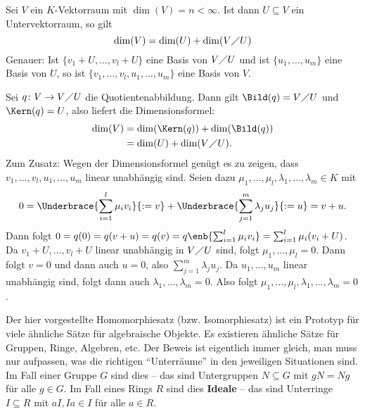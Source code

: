\begin{satz}
	\label{satz:11.9}
	Sei $V$ ein $K$-Vektorraum mit $\dim(V) = n < \infty$.
	Ist dann $U \subseteq V$ ein Untervektorraum, so gilt
	\[
		\dim(V) = \dim(U) + \dim(V \diagup U)
	\]
	Genauer: Ist $\{v_1+U,\dots,v_l + U\}$ eine Basis von $V \diagup U$ und ist $\{u_1,\dots,u_m\}$ eine Basis von $U$, so ist $\{v_1,\dots,v_l,u_1,\dots,u_m\}$ eine Basis von $V$.
\end{satz}

\begin{beweis}
	Sei $q \colon V \rightarrow V \diagup U$ die Quotientenabbildung.
	Dann gilt $\Bild(q) = V \diagup U$ und $\Kern(q) = U$, also liefert die Dimensionsformel:
	\begin{align*}
		\dim(V) &= \dim(\Kern(q)) + \dim(\Bild(q)) \\
		&= \dim(U) + \dim(V\diagup U).
	\end{align*}
	\newpage
	Zum Zusatz: Wegen der Dimensionsformel genügt es zu zeigen, dass $v_1,\dots,v_l,u_1,\dots,u_m$ linear unabhängig sind.
	Seien dazu $\mu_1,\dots,\mu_l,\lambda_1,\dots,\lambda_m \in K$ mit
	\[
		0 = \Underbrace{\sum_{i=1}^{l} \mu_i v_i}{:= v} + \Underbrace{\sum_{j=1}^{m} \lambda_j u_j}{:= u}  = v + u.
	\]
	Dann folgt $0 = q(0) = q(v+u) = q(v) = q \enb{\sum_{i=1}^{l} \mu_i v_i} = \sum_{i=1}^{l} \mu_i (v_i+U)$.
	Da $v_1+U, \dots, v_l+U$ linear unabhängig in $V \diagup U$ sind, folgt $\mu_1,\dots,\mu_l = 0$.
	Dann folgt $v = 0$ und dann auch $u = 0$, also $\sum_{j=1}^{m} \lambda_j u_j$.
	Da $u_1,\dots,u_m$ linear unabhängig sind, folgt dann auch $\lambda_1,\dots,\lambda_m = 0$.
	Also folgt $\mu_1,\dots,\mu_l,\lambda_1,\dots,\lambda_m = 0$. \qedhere
\end{beweis}

\begin{bemerkung}
	\label{bem:11.10}
	Der hier vorgestellte Homomorphiesatz (bzw. Isomorphiesatz) ist ein Prototyp für viele ähnliche Sätze für algebraische Objekte.
	Es existieren ähnliche Sätze für Gruppen, Ringe, Algebren, etc.
	Der Beweis ist eigentlich immer gleich, man muss nur aufpassen, was die richtigen \enquote{Unterräume} in den jeweiligen Situationen sind.
	Im Fall einer Gruppe $G$ sind dies  -- das sind Untergruppen $N \subseteq G$ mit $gN = Ng$ für alle $g \in G$.
	Im Fall eines Rings $R$ sind dies \textbf{Ideale} -- das sind Unterringe $I \subseteq R$ mit $aI, Ia \in I$ für alle $a \in R$. 
\end{bemerkung}

